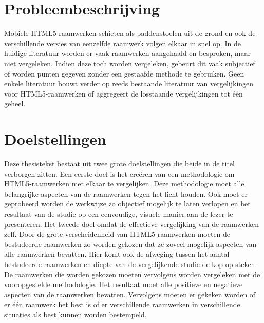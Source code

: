 \section{Probleembeschrijving} %
Mobiele HTML5-raamwerken schieten als paddenstoelen uit de grond en ook de verschillende versies van eenzelfde raamwerk volgen elkaar in snel op.
In de huidige literatuur worden er vaak raamwerken aangehaald en besproken, maar niet vergeleken.
Indien deze toch worden vergeleken, gebeurt dit vaak subjectief of worden punten gegeven zonder een gestaafde methode te gebruiken.
Geen enkele literatuur bouwt verder op reeds bestaande literatuur van vergelijkingen voor HTML5-raamwerken of aggregeert de losstaande vergelijkingen tot één geheel.

\section{Doelstellingen} %
Deze thesistekst bestaat uit twee grote doelstellingen die beide in de titel verborgen zitten.
Een eerste doel is het creëren van een methodologie om HTML5-raamwerken met elkaar te vergelijken.
Deze methodologie moet alle belangrijke aspecten van de raamwerken tegen het licht houden.
Ook moet er geprobeerd worden de werkwijze zo objectief mogelijk te laten verlopen en het resultaat van de studie op een eenvoudige,  visuele manier aan de lezer te presenteren.
Het tweede doel omdat de effectieve vergelijking van de raamwerken zelf.
Door de grote verscheidenheid van HTML5-raamwerken moeten de bestudeerde raamwerken zo worden gekozen dat ze zoveel mogelijk aspecten van alle raamwerken bevatten.
Hier komt ook de afweging tussen het aantal bestudeerde raamwerken en diepte van de vergelijkende studie de kop op steken.
De raamwerken die worden gekozen moeten vervolgens worden vergeleken met de vooropgestelde methodologie.
Het resultaat moet alle positieve en negatieve aspecten van de raamwerken bevatten.
Vervolgens moeten er gekeken worden of er één raamwerk het best is of er verschillende raamwerken in verschillende situaties als best kunnen worden bestempeld.


